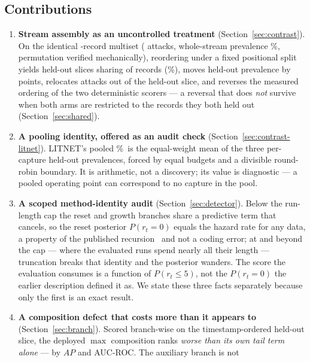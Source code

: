 \documentclass[manuscript,anonymous,review]{acmart}
\begin{document}
\subsection*{Contributions}
\begin{enumerate}
\item \textbf{Stream assembly as an uncontrolled treatment}
(Section~\ref{sec:contrast}). On the identical \CicidsArmRows-record multiset
(\CicidsArmAttacks{} attacks, whole-stream prevalence
\CicidsArmPrevalencePct\%, permutation verified mechanically), reordering under
a fixed positional split yields held-out slices sharing
\CicidsHeldoutOverlap{} of \CicidsHeldoutSize{} records
(\CicidsHeldoutOverlapPct\%), moves held-out prevalence by
\SFourCicidsPrevShiftAbsPp{} points, relocates
\CicidsAttacksMovedOutOfHeldout{} attacks out of the held-out slice, and
reverses the measured ordering of the two deterministic scorers ---
a reversal that does \emph{not} survive when both arms are restricted to the
records they both held out (Section~\ref{sec:shared}).
\item \textbf{A pooling identity, offered as an audit check}
(Section~\ref{sec:contrast-litnet}). LITNET's pooled
\SFourLitnetPooledTestPrev\%\ is the equal-weight mean of the three per-capture
held-out prevalences, forced by equal budgets and a divisible round-robin
boundary. It is arithmetic, not a discovery; its value is diagnostic --- a
pooled operating point can correspond to no capture in the pool.
\item \textbf{A scoped method-identity audit} (Section~\ref{sec:detector}).
Below the run-length cap the reset and growth branches share a predictive term
that cancels, so the reset posterior $P(r_t{=}0)$ equals the hazard rate for
any data, a property of the published recursion~\citep{adams2007bocpd} and not
a coding error; at and beyond the cap --- where the evaluated runs spend
nearly all their length --- truncation breaks that identity and the posterior
wanders. The score the evaluation consumes is a function of $P(r_t\le5)$, not
the $P(r_t{=}0)$ the earlier description defined it as. We state these three
facts separately because only the first is an exact result.
\item \textbf{A composition defect that costs more than it appears to}
(Section~\ref{sec:branch}). Scored branch-wise on the timestamp-ordered
held-out slice, the deployed $\max$ composition ranks \emph{worse than its own
tail term alone} --- by \RevBranchTailMinusCombinedAucpr{} $AP$ and
\RevBranchTailMinusCombinedAucroc{} AUC-ROC. The auxiliary branch is not

\end{enumerate}
\end{document}
